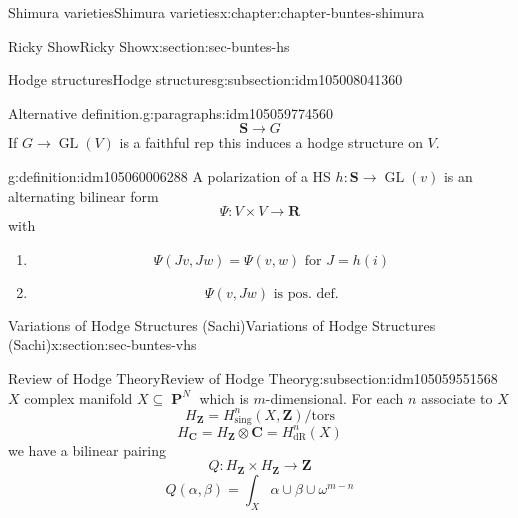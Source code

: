 \documentclass[oneside,10pt,]{book}
\numberwithin{equation}{section}
\newcommand{\ZZ}{\mathbf{Z}}
\newcommand{\RR}{\mathbf{R}}
\newcommand{\CC}{\mathbf{C}}
\newcommand{\dR}{\mathrm{dR}}
\newcommand{\tors}{\mathrm{tors}}
\DeclareMathOperator{\PP}{\mathbf{P}}
\DeclareMathOperator{\GL}{GL}
\begin{document}
\begin{chapterptx}{Shimura varieties}{}{Shimura varieties}{}{}{x:chapter:chapter-buntes-shimura}
\begin{sectionptx}{Ricky Show}{}{Ricky Show}{}{}{x:section:sec-buntes-hs}
\begin{subsectionptx}{Hodge structures}{}{Hodge structures}{}{}{g:subsection:idm105008041360}
\begin{paragraphs}{Alternative definition.}{g:paragraphs:idm105059774560}
\begin{equation*}
\mathbf S \to G
\end{equation*}
If \(G \to \GL(V)\) is a faithful rep this induces a hodge structure on \(V\).%
\begin{definition}{}{g:definition:idm105060006288}%
A polarization of a HS \(h\colon \mathbf S \to \GL(v)\) is an alternating bilinear form%
\begin{equation*}
\Psi \colon V\times V \to \RR
\end{equation*}
with%
\begin{enumerate}
\item{}%
\begin{equation*}
\Psi (Jv,Jw) =  \Psi(v,w) \text{ for } J = h(i)
\end{equation*}
%
\item{}%
\begin{equation*}
\Psi(v,Jw) \text{ is pos. def.}
\end{equation*}
%
\end{enumerate}
%
\end{definition}
\end{paragraphs}%
\end{subsectionptx}
\end{sectionptx}
%
%
\typeout{************************************************}
\typeout{************************************************}
%
\begin{sectionptx}{Variations of Hodge Structures (Sachi)}{}{Variations of Hodge Structures (Sachi)}{}{}{x:section:sec-buntes-vhs}
%
%
\typeout{************************************************}
\typeout{************************************************}
%
\begin{subsectionptx}{Review of Hodge Theory}{}{Review of Hodge Theory}{}{}{g:subsection:idm105059551568}
\(X\) complex manifold \(X\subseteq \PP^N\) which is \(m\)-dimensional. For each \(n\) associate to \(X\)%
\begin{equation*}
H_\ZZ = H^n_{\mathrm{sing}}(X, \ZZ) / \tors
\end{equation*}
%
\begin{equation*}
H_\CC = H_\ZZ \otimes \CC = H^n_\dR(X)
\end{equation*}
we have a bilinear pairing%
\begin{equation*}
Q\colon H_\ZZ \times H_\ZZ \to \ZZ
\end{equation*}
%
\begin{equation*}
Q(\alpha,\beta) = \int_X \alpha \cup \beta \cup \omega^{m-n}

\end{equation*}
\end{subsectionptx}
\end{sectionptx}
\end{chapterptx}
\end{document}

